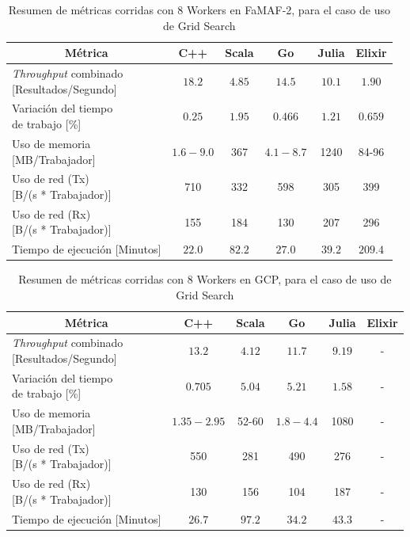 \documentclass[11pt]{article}
\providecommand{\row}[1]{\parbox{150pt}{\setlength{\baselineskip}{0.2\baselineskip}\strut#1\strut}}
\newcommand{\english}[1]{\textit{#1}}
\begin{document}
\begin{table}[H]
\centering
\begin{tabular}{|l|c|c|c|c|c|}
\hline
\multicolumn{1}{|c|}{Métrica} & C++ & Scala & Go & Julia & Elixir \\ \hline
\row{\english{Throughput} combinado \\ {[Resultados/Segundo]}} & $18.2$ & $4.85$ & $14.5$ & $10.1$ & $1.90$ \\ \hline
\row{Variación del tiempo \\ de trabajo {[}\%{]}} & $0.25$ & $1.95$ & $0.466$ & $1.21$ & $0.659$ \\ \hline
\row{Uso de memoria \\ {[}MB/Trabajador{]}} & $1.6-9.0$ & 367 & $4.1-8.7$ & 1240 & 84-96 \\ \hline
\row{Uso de red (Tx)\\ {[}B/(s * Trabajador){]}} & 710 & 332 & 598 & 305 & 399 \\ \hline
\row{Uso de red (Rx)\\ {[}B/(s * Trabajador){]}} & 155 & 184 & 130 & 207 & 296 \\ \hline
Tiempo de ejecución {[}Minutos{]} & $22.0$ & $82.2$ & $27.0$ & $39.2$ & $209.4$ \\ \hline
\end{tabular}
\caption{Resumen de métricas corridas con 8 Workers en FaMAF-2, para el caso de uso de Grid Search}
\label{tab:gs:8_workers_famaf2}
\end{table}


\begin{table}[H]
\centering
\begin{tabular}{|l|c|c|c|c|c|}
\hline
\multicolumn{1}{|c|}{Métrica} & C++ & Scala & Go & Julia & Elixir \\ \hline
\row{\english{Throughput} combinado\\{[Resultados/Segundo]}} & $13.2$ & $4.12$ & $11.7$ & $9.19$ & - \\ \hline
\row{Variación del tiempo \\ de trabajo {[}\%{]}} & $0.705$ & $5.04$ & $5.21$ & $1.58$ & - \\ \hline
\row{Uso de memoria \\ {[}MB/Trabajador{]}} & $1.35-2.95$ & 52-60 & $1.8-4.4$ & 1080 & - \\ \hline
\row{Uso de red (Tx)\\ {[}B/(s * Trabajador){]}} & 550 & 281 & 490 & 276 & - \\ \hline
\row{Uso de red (Rx)\\ {[}B/(s * Trabajador){]}} & 130 & 156 & 104 & 187 & - \\ \hline
Tiempo de ejecución {[}Minutos{]} & $26.7$ & $97.2$ & $34.2$ & $43.3$ & - \\ \hline
\end{tabular}
\caption{Resumen de métricas corridas con 8 Workers en GCP, para el caso de uso de Grid Search}
\label{tab:gs:image_sizes}
\end{table}
\end{document}
